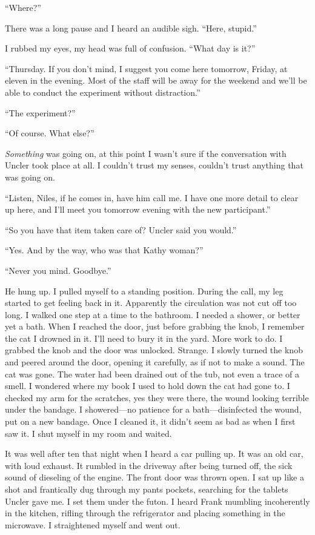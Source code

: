 ``Where?''

There was a long pause and I heard an audible sigh. ``Here, stupid.''

I rubbed my eyes, my head was full of confusion. ``What day is it?''

``Thursday. If you don't mind, I suggest you come here tomorrow, Friday,
at eleven in the evening. Most of the staff will be away for the weekend
and we'll be able to conduct the experiment without distraction.''

``The experiment?''

``Of course. What else?''

\emph{Something} was going on, at this point I wasn't sure if the
conversation with Uncler took place at all. I couldn't trust my senses,
couldn't trust anything that was going on.

``Listen, Niles, if he comes in, have him call me. I have one more
detail to clear up here, and I'll meet you tomorrow evening with the new
participant.''

``So you have that item taken care of? Uncler said you would.''

``Yes. And by the way, who was that Kathy woman?''

``Never you mind. Goodbye.''

He hung up. I pulled myself to a standing position. During the call, my
leg started to get feeling back in it. Apparently the circulation was
not cut off too long. I walked one step at a time to the bathroom. I
needed a shower, or better yet a bath. When I reached the door, just
before grabbing the knob, I remember the cat I drowned in it. I'll need
to bury it in the yard. More work to do. I grabbed the knob and the door
was unlocked. Strange. I slowly turned the knob and peered around the
door, opening it carefully, as if not to make a sound. The cat was gone.
The water had been drained out of the tub, not even a trace of a smell.
I wondered where my book I used to hold down the cat had gone to. I
checked my arm for the scratches, yes they were there, the wound looking
terrible under the bandage. I showered---no patience for a
bath---disinfected the wound, put on a new bandage. Once I cleaned it,
it didn't seem as bad as when I first saw it. I shut myself in my room
and waited.

It was well after ten that night when I heard a car pulling up. It was
an old car, with loud exhaust. It rumbled in the driveway after being
turned off, the sick sound of dieseling of the engine. The front door
was thrown open. I sat up like a shot and frantically dug through my
pants pockets, searching for the tablets Uncler gave me. I set them
under the futon. I heard Frank mumbling incoherently in the kitchen,
rifling through the refrigerator and placing something in the microwave.
I straightened myself and went out.

